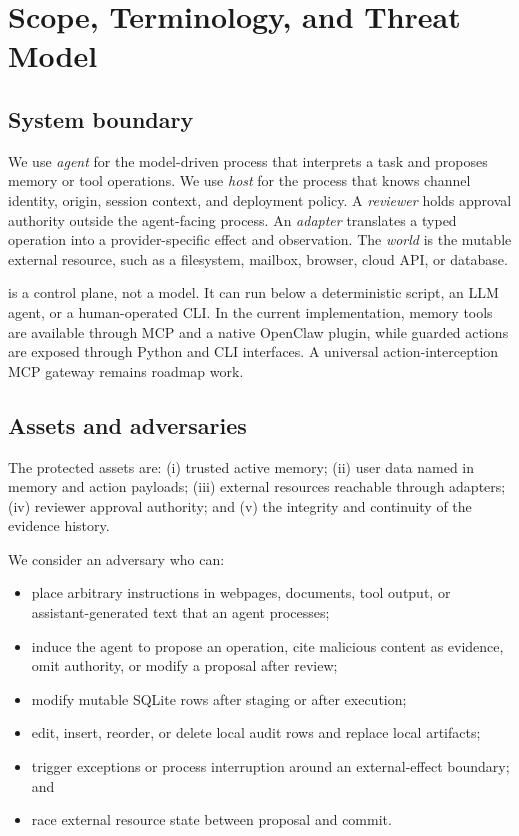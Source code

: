 \section{Scope, Terminology, and Threat Model}

\subsection{System boundary}

We use \emph{agent} for the model-driven process that interprets a task and proposes memory or tool operations. We use \emph{host} for the process that knows channel identity, origin, session context, and deployment policy. A \emph{reviewer} holds approval authority outside the agent-facing process. An \emph{adapter} translates a typed operation into a provider-specific effect and observation. The \emph{world} is the mutable external resource, such as a filesystem, mailbox, browser, cloud API, or database.

\system{} is a control plane, not a model. It can run below a deterministic script, an LLM agent, or a human-operated CLI. In the current implementation, memory tools are available through MCP and a native OpenClaw plugin, while guarded actions are exposed through Python and CLI interfaces. A universal action-interception MCP gateway remains roadmap work.

\subsection{Assets and adversaries}

The protected assets are: (i) trusted active memory; (ii) user data named in memory and action payloads; (iii) external resources reachable through adapters; (iv) reviewer approval authority; and (v) the integrity and continuity of the evidence history.

We consider an adversary who can:

\begin{itemize}
  \item place arbitrary instructions in webpages, documents, tool output, or assistant-generated text that an agent processes;
  \item induce the agent to propose an operation, cite malicious content as evidence, omit authority, or modify a proposal after review;
  \item modify mutable SQLite rows after staging or after execution;
  \item edit, insert, reorder, or delete local audit rows and replace local artifacts;
  \item trigger exceptions or process interruption around an external-effect boundary; and
  \item race external resource state between proposal and commit.
\end{itemize}

